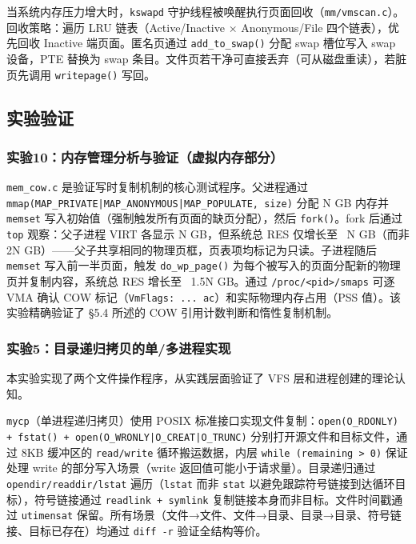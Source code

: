 \documentclass[a4paper]{article}
\begin{document}
当系统内存压力增大时，\texttt{kswapd} 守护线程被唤醒执行页面回收（\texttt{mm/vmscan.c}）。回收策略：遍历 LRU 链表（Active/Inactive × Anonymous/File 四个链表），优先回收 Inactive 端页面。匿名页通过 \texttt{add\_to\_swap()} 分配 swap 槽位写入 swap 设备，PTE 替换为 swap 条目。文件页若干净可直接丢弃（可从磁盘重读），若脏页先调用 \texttt{writepage()} 写回。

\subsection{实验验证}

\subsubsection{实验10：内存管理分析与验证（虚拟内存部分）}

\texttt{mem\_cow.c} 是验证写时复制机制的核心测试程序。父进程通过 \texttt{mmap(MAP\_PRIVATE|MAP\_ANONYMOUS|MAP\_POPULATE, size)} 分配 N GB 内存并 \texttt{memset} 写入初始值（强制触发所有页面的缺页分配），然后 \texttt{fork()}。fork 后通过 \texttt{top} 观察：父子进程 VIRT 各显示 N GB，但系统总 RES 仅增长至 ~N GB（而非 2N GB）——父子共享相同的物理页框，页表项均标记为只读。子进程随后 \texttt{memset} 写入前一半页面，触发 \texttt{do\_wp\_page()} 为每个被写入的页面分配新的物理页并复制内容，系统总 RES 增长至 ~1.5N GB。通过 \texttt{/proc/<pid>/smaps} 可逐 VMA 确认 COW 标记（\texttt{VmFlags: ... ac}）和实际物理内存占用（PSS 值）。该实验精确验证了 §5.4 所述的 COW 引用计数判断和惰性复制机制。

\subsubsection{实验5：目录递归拷贝的单/多进程实现}

本实验实现了两个文件操作程序，从实践层面验证了 VFS 层和进程创建的理论认知。

\texttt{mycp}（单进程递归拷贝）使用 POSIX 标准接口实现文件复制：\texttt{open(O\_RDONLY) + fstat() + open(O\_WRONLY|O\_CREAT|O\_TRUNC)} 分别打开源文件和目标文件，通过 8KB 缓冲区的 \texttt{read/write} 循环搬运数据，内层 \texttt{while (remaining > 0)} 保证处理 write 的部分写入场景（write 返回值可能小于请求量）。目录递归通过 \texttt{opendir/readdir/lstat} 遍历（\texttt{lstat} 而非 \texttt{stat} 以避免跟踪符号链接到达循环目标），符号链接通过 \texttt{readlink + symlink} 复制链接本身而非目标。文件时间戳通过 \texttt{utimensat} 保留。所有场景（文件→文件、文件→目录、目录→目录、符号链接、目标已存在）均通过 \texttt{diff -r} 验证全结构等价。
\end{document}

